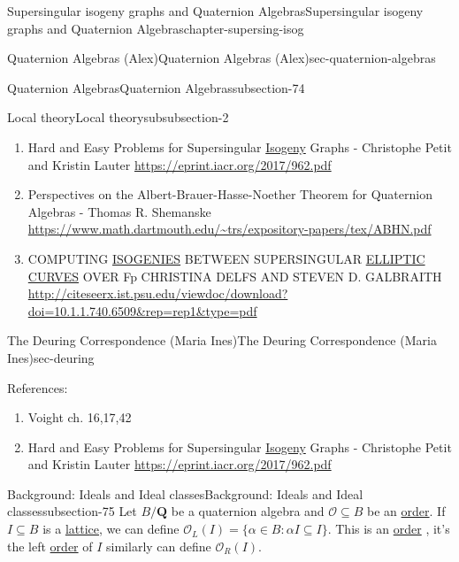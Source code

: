 \documentclass[oneside,10pt,]{book}
\numberwithin{equation}{section}
\newcommand{\QQ}{\mathbf{Q}}
\newcommand{\ints}{\mathcal{O}}
\begin{document}
\begin{chapterptx}{Supersingular isogeny graphs and Quaternion Algebras}{}{Supersingular isogeny graphs and Quaternion Algebras}{}{}{chapter-supersing-isog}
\begin{sectionptx}{Quaternion Algebras (Alex)}{}{Quaternion Algebras (Alex)}{}{}{sec-quaternion-algebras}
\begin{subsectionptx}{Quaternion Algebras}{}{Quaternion Algebras}{}{}{subsection-74}
\begin{subsubsectionptx}{Local theory}{}{Local theory}{}{}{subsubsection-2}
\begin{enumerate}
\item\hypertarget{li-231}{}Hard and Easy Problems for Supersingular \hyperref[def-supersing-isog-isog]{Isogeny} Graphs - Christophe Petit and Kristin Lauter \url{https://eprint.iacr.org/2017/962.pdf}%
\item\hypertarget{li-232}{}Perspectives on the Albert-Brauer-Hasse-Noether Theorem for Quaternion Algebras -  Thomas R. Shemanske \url{https://www.math.dartmouth.edu/\~trs/expository-papers/tex/ABHN.pdf}%
\item\hypertarget{li-233}{}COMPUTING \hyperref[def-supersing-isog-isog]{ISOGENIES} BETWEEN SUPERSINGULAR \hyperref[def-supersing-isog-ec]{ELLIPTIC CURVES} OVER Fp CHRISTINA DELFS AND STEVEN D. GALBRAITH \url{http://citeseerx.ist.psu.edu/viewdoc/download?doi=10.1.1.740.6509\&rep=rep1\&type=pdf}%
\end{enumerate}
%
\end{subsubsectionptx}
\end{subsectionptx}
\end{sectionptx}
%
%
\typeout{************************************************}
\typeout{************************************************}
%
\begin{sectionptx}{The Deuring Correspondence (Maria Ines)}{}{The Deuring Correspondence (Maria Ines)}{}{}{sec-deuring}
\begin{introduction}{}%
\hypertarget{p-936}{}%
References:%
\par
\hypertarget{p-937}{}%
\leavevmode%
\begin{enumerate}
\item\hypertarget{li-234}{}Voight ch. 16,17,42%
\item\hypertarget{li-235}{}Hard and Easy Problems for Supersingular \hyperref[def-supersing-isog-isog]{Isogeny} Graphs - Christophe Petit and Kristin Lauter \url{https://eprint.iacr.org/2017/962.pdf}%
\end{enumerate}
%
\end{introduction}%
%
%
\typeout{************************************************}
\typeout{************************************************}
%
\begin{subsectionptx}{Background: Ideals and Ideal classes}{}{Background: Ideals and Ideal classes}{}{}{subsection-75}
\hypertarget{p-938}{}%
Let \(B/\QQ\) be a quaternion algebra and  \(\ints \subseteq B\) be an \hyperref[def-order-quaternion]{order}. If \(I \subseteq B \) is a  \hyperref[def-buntes-lattice]{lattice}, we can define \(\ints_L (I) = \{ \alpha\in  B :  \alpha I  \subseteq I \}\). This is an \hyperref[def-order-quaternion]{order} , it's the left \hyperref[def-order-quaternion]{order} of  \(I\) similarly can define \(\ints_R (I) \).%

\end{subsectionptx}
\end{sectionptx}
\end{chapterptx}
\end{document}

